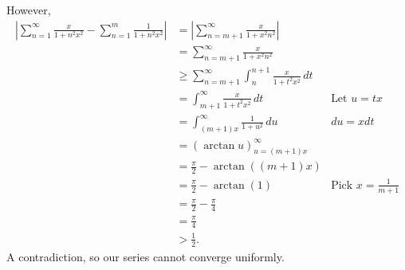 \documentclass{article}
\begin{document}
\begin{enumerate}
  However,
  \begin{align*}
      \left| \sum_{n=1}^{\infty} \frac{x}{1+n^2x^2}-\sum_{n=1}^{m} \frac{1}{1+n^2x^2} \right| &= \left| \sum_{n=m+1}^{\infty} \frac{x}{1+x^2n^2} \right|  \\
                  &=\sum_{n=m+1}^{\infty} \frac{x}{1+x^2n^2}\\
                  &\geq \sum_{n=m+1}^{\infty} \int_{n}^{n+1} \frac{x}{1+t^2x^2} \, d t \\
                    &= \int_{m+1}^{\infty} \frac{x}{1+t^2x^2} \, d t &\text{Let }u=tx \\
                    &= \int_{(m+1)x}^{\infty} \frac{1}{1+u^2} \, d u &du=xdt \\
                    &= \left( \arctan u \right)_{u=(m+1)x}^{\infty} \\
                    &= \frac{\pi}{2}-\arctan ((m+1)x)\\
                    &= \frac{\pi}{2}-\arctan(1) &\text{Pick }x=\frac{1}{m+1} \\
                    &= \frac{\pi}{2}-\frac{\pi}{4} \\
                    &= \frac{\pi}{4}\\
                    & >\frac{1}{2}
  .\end{align*}
A contradiction, so our series cannot converge uniformly.

\end{enumerate}
\end{document}

